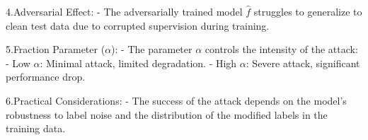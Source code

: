 4.Adversarial Effect:
   - The adversarially trained model $\hat{f}$ struggles to generalize to clean test data due to corrupted supervision during training.

5.Fraction Parameter ($\alpha$):
   - The parameter $\alpha$ controls the intensity of the attack:
     - Low $\alpha$: Minimal attack, limited degradation.
     - High $\alpha$: Severe attack, significant performance drop.

6.Practical Considerations:
   - The success of the attack depends on the model's robustness to label noise and the distribution of the modified labels in the training data.